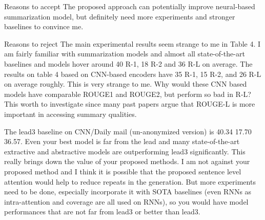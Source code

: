 Reasons to accept
The proposed approach can potentially improve neural-based summarization model, but definitely need more experiments and stronger baselines to convince me.

Reasons to reject
The main experimental results seem strange to me in Table 4. I am fairly familiar with summarization models and almost all state-of-the-art baselines and models hover around 40 R-1, 18 R-2 and 36 R-L on average. The results on table 4 based on CNN-based encoders have 35 R-1, 15 R-2, and 26 R-L on average roughly. This is very strange to me. Why would these CNN based models have comparable ROUGE1 and ROUGE2, but perform so bad in R-L? This worth to investigate since many past papers argue that ROUGE-L is more important in accessing summary qualities.

The lead3 baseline on CNN/Daily mail (un-anonymized version) is 40.34 17.70 36.57. Even your best model is far from the lead and many state-of-the-art extractive and abstractive models are outperforming lead3 significantly. This really brings down the value of your proposed methods. I am not against your proposed method and I think it is possible that the proposed sentence level attention would help to reduce repeats in the generation. But more experiments need to be done, especially incorporate it with SOTA baselines (even RNNs as intra-attention and coverage are all used on RNNs), so you would have model performances that are not far from lead3 or better than lead3.
